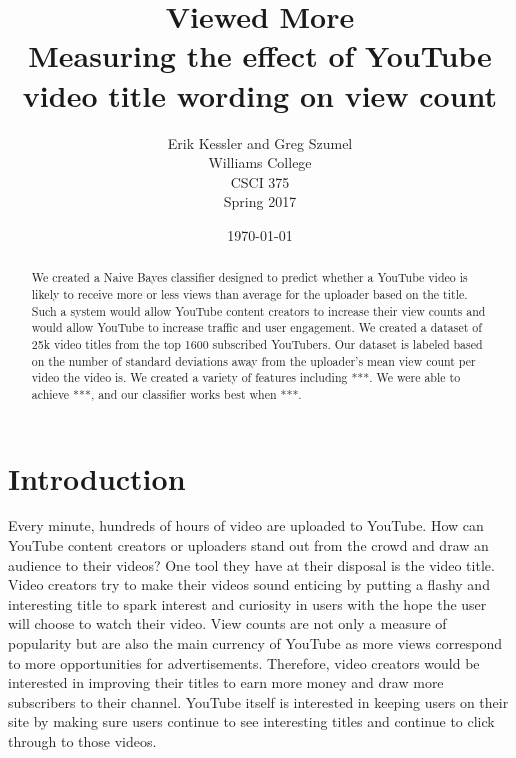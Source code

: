 \documentclass[a4paper,12pt]{article}
\begin{document}
\thispagestyle{plain}
\pagestyle{fancy}
\clearpage
\setlength{\headsep}{0.4in}

\title{Viewed More\\ \large Measuring the effect of YouTube video title wording on view count}
\date{\today}
\author{
  {\rm Erik Kessler and Greg Szumel}\\
  Williams College\\
  CSCI 375 \\
  Spring 2017
}

\maketitle

\cfoot{\thepage}

\begin{abstract}
We created a Naive Bayes classifier designed to predict whether a YouTube video is likely to receive more or less views than average for the uploader based on the title. Such a system would allow YouTube content creators to increase their view counts and would allow YouTube to increase traffic and user engagement. We created a dataset of 25k video titles from the top 1600 subscribed YouTubers. Our dataset is labeled based on the number of standard deviations away from the uploader's mean view count per video the video is. We created a variety of features including ***. We were able to achieve ***, and our classifier works best when ***. 
\end{abstract}


\section{Introduction}
Every minute, hundreds of hours of video are uploaded to YouTube. How can YouTube content creators or uploaders stand out from the crowd and draw an audience to their videos? One tool they have at their disposal is the video title. Video creators try to make their videos sound enticing by putting a flashy and interesting title to spark interest and curiosity in users with the hope the user will choose to watch their video. View counts are not only a measure of popularity but are also the main currency of YouTube as more views correspond to more opportunities for advertisements. Therefore, video creators would be interested in improving their titles to earn more money and draw more subscribers to their channel. YouTube itself is interested in keeping users on their site by making sure users continue to see interesting titles and continue to click through to those videos.
\end{document}
